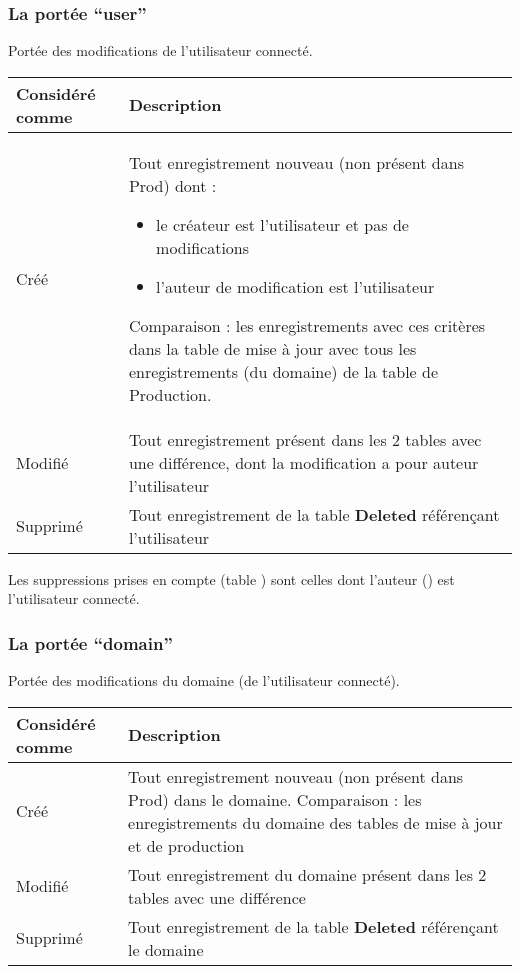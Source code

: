 \subsubsection{La portée ``user''}

Portée des modifications de l'utilisateur connecté.\\

\begin{tabular}{|p{4cm}|p{10cm}|}
\hline
\textbf{Considéré comme} & \textbf{Description}\\
\hline
Créé &
Tout enregistrement nouveau (non présent dans Prod) dont :
\begin{itemize}
\item le créateur est l'utilisateur et pas de modifications
\item l'auteur de modification est l'utilisateur
\end{itemize}
Comparaison : les enregistrements avec ces critères dans la table de mise à jour avec tous les enregistrements (du domaine) de la table de Production.
\\
\hline
Modifié &
Tout enregistrement présent dans les 2 tables avec une différence, dont la modification a pour auteur l'utilisateur
\\
\hline
Supprimé &
Tout enregistrement de la table \textbf{Deleted} référençant l'utilisateur
\\
\hline
\end{tabular}
\vspace{0,3cm}

Les suppressions prises en compte (table ) sont celles dont l'auteur () est l'utilisateur connecté.


\subsubsection{La portée ``domain''}

Portée des modifications du domaine (de l'utilisateur connecté).\\

\begin{tabular}{|p{4cm}|p{10cm}|}
\hline
\textbf{Considéré comme} & \textbf{Description}\\
\hline
Créé &
Tout enregistrement nouveau (non présent dans Prod) dans le domaine.
Comparaison : les enregistrements du domaine des tables de mise à jour et de production
\\
\hline
Modifié &
Tout enregistrement du domaine présent dans les 2 tables avec une différence
\\
\hline
Supprimé &
Tout enregistrement de la table \textbf{Deleted} référençant le domaine
\\
\hline
\end{tabular}
\vspace{0,3cm}

